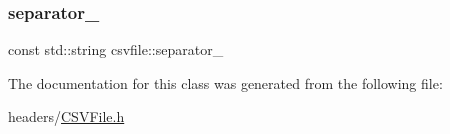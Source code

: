 \mbox{\label{classcsvfile_a93e4acb10aa1213d248b4113c99988ad}} 
\subsubsection{\texorpdfstring{separator\+\_\+}{separator\_}}
{\footnotesize\ttfamily const std\+::string csvfile\+::separator\+\_\+\hspace{0.3cm}{\ttfamily [private]}}



The documentation for this class was generated from the following file\+:\begin{DoxyCompactItemize}
\item 
headers/\hyperlink{CSVFile_8h}{C\+S\+V\+File.\+h}\end{DoxyCompactItemize}
